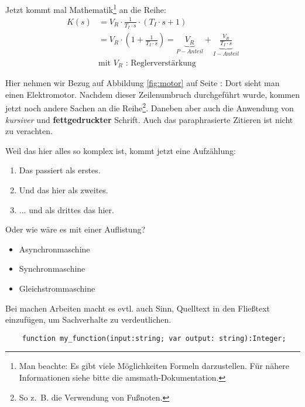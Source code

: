 Jetzt kommt mal Mathematik\footnote{Man beachte: Es gibt viele Möglichkeiten Formeln darzustellen. Für nähere Informationen siehe bitte die amsmath-Dokumentation.} an die Reihe:
\begin{equation}
\begin{split}
		 K(s) &= V_R \cdot \frac{1}{T_I \cdot s}\cdot \left( T_I \cdot s + 1 \right) \\
					  &= V_R \cdot \left( 1 + \frac{1}{T_I \cdot s} \right) = \underbrace{V_R}_{P-Anteil} + \underbrace{\frac{V_R}{T_I \cdot s}}_{I-Anteil} \\
						&\text{mit $V_R$ : Reglerverstärkung} 
\end{split}
\end{equation}

Hier nehmen wir Bezug auf Abbildung \ref{fig:motor} auf Seite \pageref{fig:motor}: Dort sieht man einen Elektromotor.\newline
Nachdem dieser Zeilenumbruch durchgeführt wurde, kommen jetzt noch andere Sachen an die Reihe\footnote{So z.~B. die Verwendung von Fußnoten.}. Daneben aber auch die Anwendung von \textit{kursiver} und \textbf{fettgedruckter} Schrift. Auch das paraphrasierte Zitieren ist nicht zu verachten\cite{PROFMUSTER11}.

Weil das hier alles so komplex ist, kommt jetzt eine Aufzählung:
\begin{enumerate}
	\item Das passiert als erstes.
	\item Und das hier als zweites.
	\item ... und als drittes das hier.
\end{enumerate}
Oder wie wäre es mit einer Auflistung?
\begin{itemize}
	\item Asynchronmaschine
	\item Synchronmaschine
	\item Gleichstrommaschine
\end{itemize}
Bei machen Arbeiten macht es evtl. auch Sinn, Quelltext in den Fließtext einzufügen, um Sachverhalte zu verdeutlichen. 
\begin{verbatim}
	function my_function(input:string; var output: string):Integer;
\end{verbatim}